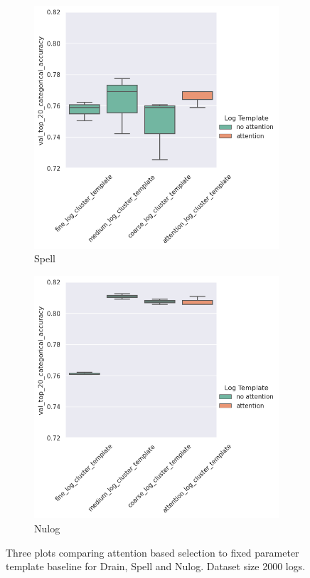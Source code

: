 \begin{figure}[H]
\begin{subfigure}[b]{0.45\textwidth}
        \includegraphics[keepaspectratio=true,scale=0.45]{figures/5_results/spell_hdfs.png}
         \caption{Spell}
         \label{fig:results:spell_hdfs}
     \end{subfigure}
     \hfill
     \begin{subfigure}[b]{0.45\textwidth}
         \centering
        \includegraphics[keepaspectratio=true,scale=0.45]{figures/5_results/nulog_hdfs.png}
         \caption{Nulog}
         \label{results:nulog_hdfs}
     \end{subfigure}
        \caption{Three plots comparing attention based selection to fixed parameter template baseline for Drain, Spell and Nulog. Dataset size 2000 logs. }
        \label{fig:results:hdfs}
\end{figure}


